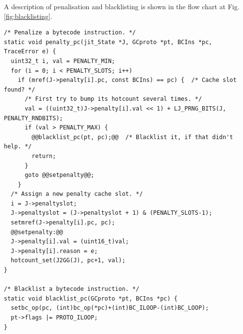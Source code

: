 A description of penalisation and blacklisting is shown in the flow chart at Fig. \ref{fig:blacklisting}.
\begin{lstlisting}[style=CStyle, caption=\texttt{lj\_trace.c}]
/* Penalize a bytecode instruction. */
static void penalty_pc(jit_State *J, GCproto *pt, BCIns *pc, TraceError e) {
  uint32_t i, val = PENALTY_MIN;
  for (i = 0; i < PENALTY_SLOTS; i++)
    if (mref(J->penalty[i].pc, const BCIns) == pc) {  /* Cache slot found? */
      /* First try to bump its hotcount several times. */
      val = ((uint32_t)J->penalty[i].val << 1) + LJ_PRNG_BITS(J, PENALTY_RNDBITS);
      if (val > PENALTY_MAX) {
        @@blacklist_pc(pt, pc);@@  /* Blacklist it, if that didn't help. */
        return;
      }
      goto @@setpenalty@@;
    }
  /* Assign a new penalty cache slot. */
  i = J->penaltyslot;
  J->penaltyslot = (J->penaltyslot + 1) & (PENALTY_SLOTS-1);
  setmref(J->penalty[i].pc, pc);
  @@setpenalty:@@
  J->penalty[i].val = (uint16_t)val;
  J->penalty[i].reason = e;
  hotcount_set(J2GG(J), pc+1, val);
}

/* Blacklist a bytecode instruction. */
static void blacklist_pc(GCproto *pt, BCIns *pc) {
  setbc_op(pc, (int)bc_op(*pc)+(int)BC_ILOOP-(int)BC_LOOP);
  pt->flags |= PROTO_ILOOP;
}
\end{lstlisting}


